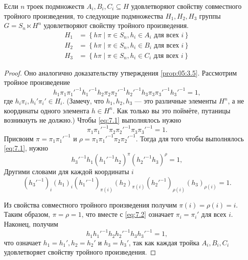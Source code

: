 \begin{theorem}
  \label{th:05:7.1} Если $n$ троек подмножеств $A_i, B_i, C_i \subseteq H$ удовлетворяют свойству совместного тройного произведения, то следующие подмножества $H_1, H_2, H_3$ группы $G = S_n \ltimes H^n$ удовлетворяют свойству тройного произведения.
  \begin{align*}
    H_1 & = \left\{ h \pi \mid \pi \in S_n, h_i \in A_i \text{ для всех } i\right\}\\
    H_2 & = \left\{ h \pi \mid \pi \in S_n, h_i \in B_i \text{ для всех } i\right\}\\
    H_3 & = \left\{ h \pi \mid \pi \in S_n, h_i \in C_i \text{ для всех } i\right\}
  \end{align*}
\end{theorem}
\begin{proof}
  Оно аналогично доказательству утверждения \ref{prop:05:3.5}. Рассмотрим тройное произведение 
  \begin{equation}\label{eq:7.1}
    h_1 \pi_1 \pi_1'^{-1} h_1'^{-1}  h_2 \pi_2 \pi_2'^{-1} h_2'^{-1}  h_3 \pi_3 \pi_3'^{-1} h_3'^{-1}  = 1,
  \end{equation}
  где $h_i \pi_i, h_i' \pi_i' \in H_i$. (Замечу, что $h_1, h_2, h_3$ --- это различные элементы $H^n$, а не координаты одного элемента $h \in H^n$. Как только вы это поймёте, путаницы возникнуть не должно.) Чтобы \eqref{eq:7.1} выполнялось нужно 
  \begin{equation}\label{eq:7.2}
    \pi_1 \pi_1'^{-1}  \pi_2 \pi_2'^{-1}  \pi_3 \pi_3'^{-1} = 1.
  \end{equation}
  Присвоим $\pi = \pi_1 \pi_1'^{-1}$ и $\rho = \pi_1 \pi_1'^{-1} \pi_2 \pi_2'^{-1}$. Тогда для того чтобы выполнялось \eqref{eq:7.1}, нужно
  \[
  	h_3'^{-1} h_1 (h_1'^{-1} h_2)^\pi (h_2'^{-1} h_3)^\rho = 1,
  \]
  Другими словами для каждой координаты $i$
  \[
  	(h_3'^{-1})_i (h_1)_i (h_1'^{-1})_{\pi(i)} (h_2)_{\pi(i)} (h_2'^{-1})_{\rho(i)} (h_3)_{\rho(i)} = 1.
  \]
  
  Из свойства совместного тройного произведения получим $\pi(i)=\rho(i)=i$. Таким образом, $\pi=\rho=1$, что вместе с \eqref{eq:7.2} означает $\pi_i = \pi_i'$ для всех $i$. Наконец, получим
  \[
  	h_1 h_1'^{-1} h_2 h_2'^{-1} h_3 h_3'^{-1} = 1,
  \]
  что означает $h_1 = h_1', h_2 = h_2'$ и $h_3 = h_3'$, так как каждая тройка $A_i, B_i, C_i$ удовлетворяет свойству тройного произведения.
\end{proof}

